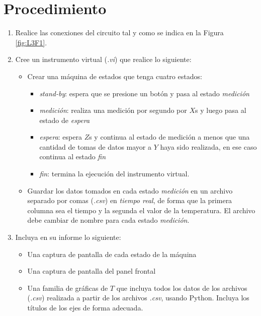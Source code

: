 \documentclass[12pt,letterpaper]{report}
\newcommand{\pro}{Procedimiento}
\begin{document}
\section{\pro}
\begin{enumerate}
\item Realice las conexiones del circuito tal y como se indica en la Figura \ref{fig:L3F1}.
\item Cree un instrumento virtual (\emph{.vi}) que realice lo siguiente:
    \begin{itemize}
        \item Crear una máquina de estados que tenga cuatro estados:
            \begin{itemize}
                \item \emph{stand-by}: espera que se presione un botón y pasa al estado \emph{medición}
                \item \emph{medición}: realiza una medición por segundo por $X$\si{\second} y luego pasa al estado de \emph{espera}
                \item \emph{espera}: espera $Z$\si{\second} y continua al estado de medición a menos que una cantidad de tomas de datos mayor a $Y$ haya sido realizada, en ese caso continua al estado  \emph{fin}
                \item \emph{fin}: termina la ejecución del instrumento virtual.
            \end{itemize}
        \item Guardar los datos tomados en cada estado \emph{medición} en un archivo separado por comas (\emph{.csv}) en \emph{tiempo real}, de forma que la primera columna sea el tiempo y la segunda el valor de la temperatura. El archivo debe cambiar de nombre para cada estado \emph{medición}. 
    \end{itemize}

\item Incluya en su informe lo siguiente:
    \begin{itemize}
        \item Una captura de pantalla de cada estado de la máquina 
        \item Una captura de pantalla del panel frontal
        \item Una familia de gráficas de $T$ que incluya todos los datos de los archivos (\emph{.csv}) realizada a partir de los archivos \emph{.csv}, usando Python. Incluya los títulos de los ejes de forma adecuada. 
    \end{itemize}
    
\end{enumerate}
\end{document}
